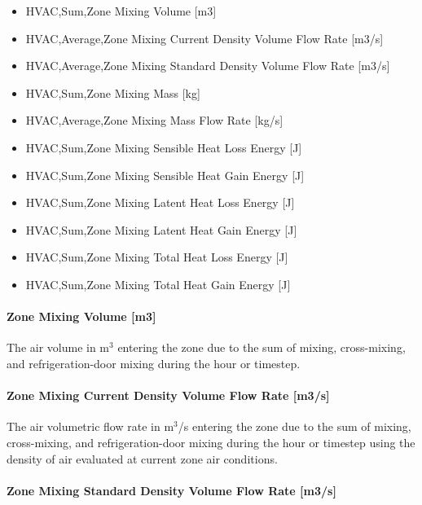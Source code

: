 \begin{itemize}
\item
  HVAC,Sum,Zone Mixing Volume {[}m3{]}
\item
  HVAC,Average,Zone Mixing Current Density Volume Flow Rate {[}m3/s{]}
\item
  HVAC,Average,Zone Mixing Standard Density Volume Flow Rate {[}m3/s{]}
\item
  HVAC,Sum,Zone Mixing Mass {[}kg{]}
\item
  HVAC,Average,Zone Mixing Mass Flow Rate {[}kg/s{]}
\item
  HVAC,Sum,Zone Mixing Sensible Heat Loss Energy {[}J{]}
\item
  HVAC,Sum,Zone Mixing Sensible Heat Gain Energy {[}J{]}
\item
  HVAC,Sum,Zone Mixing Latent Heat Loss Energy {[}J{]}
\item
  HVAC,Sum,Zone Mixing Latent Heat Gain Energy {[}J{]}
\item
  HVAC,Sum,Zone Mixing Total Heat Loss Energy {[}J{]}
\item
  HVAC,Sum,Zone Mixing Total Heat Gain Energy {[}J{]}
\end{itemize}

\paragraph{Zone Mixing Volume {[}m3{]}}\label{zone-mixing-volume-m3-1}

The air volume in m\(^{3}\) entering the zone due to the sum of mixing, cross-mixing, and refrigeration-door mixing during the hour or timestep.

\paragraph{Zone Mixing Current Density Volume Flow Rate {[}m3/s{]}}\label{zone-mixing-current-density-volumetric-flow-rate-m3s-1}

The air volumetric flow rate in m\(^{3}\)/s entering the zone due to the sum of mixing, cross-mixing, and refrigeration-door mixing during the hour or timestep using the density of air evaluated at current zone air conditions.

\paragraph{Zone Mixing Standard Density Volume Flow Rate {[}m3/s{]}}\label{zone-mixing-standard-density-volumetric-flow-rate-m3s-1}


